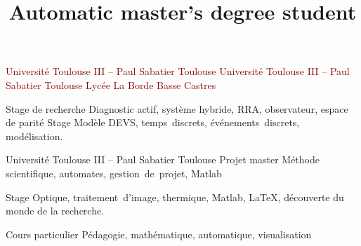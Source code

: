 \documentclass[11pt,a4paper,sans]{moderncv}        %
\title{\huge Automatic master's degree student} %
\begin{document}
\begin{samepage}
\makecvtitle
\vspace{-1cm}
\noindent\begin{minipage}[t]{.44\textwidth}
{\textcolor{darkred}{Université Toulouse III -- Paul Sabatier}}
{\textcolor{darkred}{Toulouse}}%
%
{\textcolor{darkred}{Université Toulouse III -- Paul Sabatier}}
{\textcolor{darkred}{Toulouse}}%
%
{\textcolor{darkred}{Lycée La Borde Basse}}
{\textcolor{darkred}{Castres}}%
\end{minipage}\hfill%
\noindent\begin{minipage}[t]{.51\textwidth}
%
{Stage de recherche}
{Diagnostic actif, système hybride, RRA, observateur, espace de parité}
%
{Stage}%
{Modèle DEVS, temps~discrets, événements~discrets, modélisation.}


%
{Université Toulouse III -- Paul Sabatier}
{Toulouse}%
{Projet master}%
{Méthode scientifique, automates, gestion~de~projet, Matlab}

%
{Stage}%
{Optique, traitement~d’image, thermique, Matlab, \LaTeX, découverte du monde de la recherche.}

%
{Cours particulier}
{Pédagogie, mathématique, automatique, visualisation}
\end{minipage}




\end{samepage}
\end{document}
